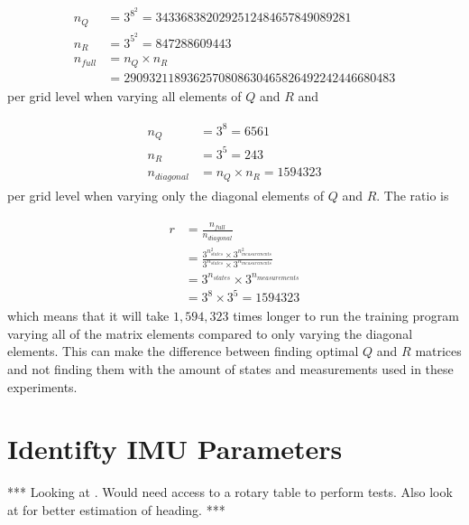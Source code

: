 \begin{align*}
\begin{split}
n_Q &= 3^{8^2} = 3433683820292512484657849089281 \\
n_R &= 3^{5^2} = 847288609443 \\
n_{full} &= n_Q \times n_R \\
&= 2909321189362570808630465826492242446680483
\end{split}
\end{align*}
per grid level when varying all elements of $Q$ and $R$ and

\begin{align*}
\begin{split}
n_Q &= 3^8 = 6561 \\
n_R &= 3^5 = 243 \\
n_{diagonal} &= n_Q \times n_R = 1594323
\end{split}
\end{align*}
per grid level when varying only the diagonal elements of $Q$ and $R$. The ratio is

\begin{align}
\label{eq:trainingRatio}
\begin{split}
r &= \frac{n_{full}}{n_{diagonal}} \\
&= \frac{3^{n_{states}^2} \times 3^{n_{measurements}^2}}{3^{n_{states}} \times 3^{n_{measurements}}} \\
&= 3^{n_{states}} \times 3^{n_{measurements}} \\
&= 3^8 \times 3^5 = 1594323
\end{split}
\end{align}
which means that it will take $1,594,323$ times longer to run the training program varying all of the matrix elements compared to only varying the diagonal elements. This can make the difference between finding optimal $Q$ and $R$ matrices and not finding them with the amount of states and measurements used in these experiments.

\section{Identifty IMU Parameters}
\label{sec:identifyimuparams}
*** Looking at \cite{ChungOjeda01}. Would need access to a rotary table to perform tests. Also look at \cite{ParkinsonHeadingEstimation01} for better estimation of heading. ***
